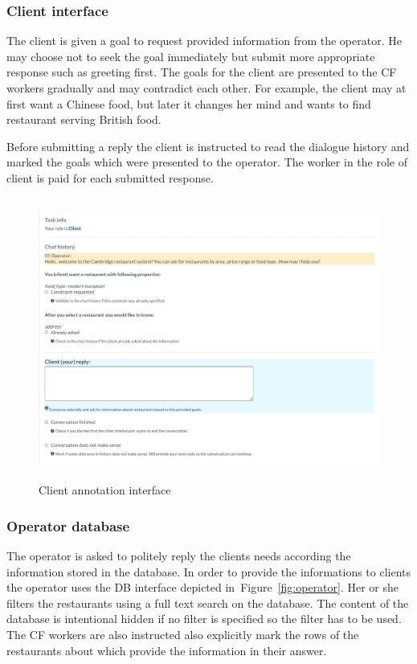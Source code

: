 \documentclass[runningheads,a4paper]{llncs}
\begin{document}
\subsubsection{Client interface}
\label{sec:client}

The client is given a goal to request provided information from the operator.
He may choose not to seek the goal immediately but submit more appropriate response such as greeting first.
The goals for the client are presented to the CF workers gradually and may contradict each other.
For example, the client may at first want a Chinese food, but later it changes her mind and wants to find restaurant serving British food.

Before submitting a reply the client is instructed to read the dialogue history and marked the goals which were presented to the operator.
The worker in the role of client is paid for each submitted response.

\begin{figure}
\begin{center}
\includegraphics[height=25em]{gui-annotators-client}
\caption{Client annotation interface}
\end{center}
\vspace{-0.80em}
\label{fig:client}
\end{figure}

\subsubsection{Operator database}
\label{sec:operator}
The operator is asked to politely reply the clients needs according the information stored in the database.
In order to provide the informations to clients the operator uses the DB interface depicted in~Figure~\ref{fig:operator}.
Her or she filters the restaurants using a full text search on the database.
The content of the database is intentional hidden if no filter is specified so the filter has to be used.
The CF workers are also instructed also explicitly mark the rows of the restaurants about which provide the information in their answer.
\end{document}
